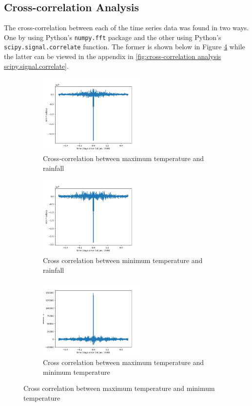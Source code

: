 \documentclass{article}
\begin{document}
\newpage
\subsection{Cross-correlation Analysis}
The cross-correlation between each of the time series data was found in two ways. One by using Python's \texttt{numpy.fft} package and the other using Python's \texttt{scipy.signal.correlate} function. The former is shown below in Figure \ref{fig:cross-correlation analysis_np.fft} while the latter can be viewed in the appendix in \ref{fig:cross-correlation analysis scipy.signal.correlate}. 

\begin{figure}[h!]
	\caption{Cross-correlation between each time-series using np.fft package}
	\begin{subfigure}{\textwidth}
		\includegraphics[width=\linewidth, height=4cm]{figures/old/cross_correlation_max_temp_rainfall.png} 
		\caption{Cross-correlation between maximum temperature and rainfall }
		\label{fig:cc_max_temp_rainfall_np}
	\end{subfigure}
	\begin{subfigure}{\textwidth}
		\includegraphics[width=\linewidth, height=4cm]{figures/old/cross_correlation_min_temp_rainfall.png}
		\caption{Cross correlation between minimum temperature and rainfall}	
		\label{fig:cc_min_temp_rainfall_np}
	\end{subfigure}
	\begin{subfigure}{\textwidth}
		\includegraphics[width=\linewidth, height=4cm]{figures/old/cross_correlation_max_temp_min_temp.png}
		\caption{Cross correlation between maximum temperature and minimum temperature}	
		\label{fig:cc_max_temp_min_temp_np}
	\end{subfigure}
	\label{fig:cross-correlation analysis_np.fft}
\end{figure}
\end{document}
